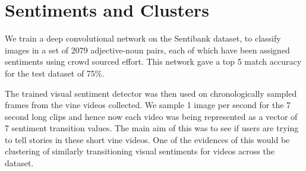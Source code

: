 \section{Sentiments and Clusters}
We train a deep convolutional network on the Sentibank \cite{SentiBank} dataset, to classify images in a set of 2079 adjective-noun pairs, each of which have been assigned sentiments using crowd sourced effort. This network gave a top 5 match accuracy for the test dataset of 75\%. 
\par
The trained visual sentiment detector was then used on chronologically sampled frames from the vine videos collected. We sample 1 image per second for the 7 second long clips and hence now each video was being represented as a vector of 7 sentiment transition values. The main aim of this was to see if users are trying to tell stories in these short vine videos. One of the evidences of this would be clustering of similarly transitioning visual sentiments for videos across the dataset. 
